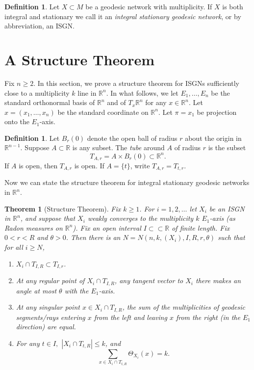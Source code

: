 \documentclass[11pt,reqno,twoside]{amsart}
\newtheorem{theorem}[lemma]{Theorem}
\theoremstyle{definition}
\newtheorem{definition}[lemma]{Definition}
\begin{document}
\begin{definition}
    Let $X \subset M$ be a geodesic network with multiplicity. If $X$ is both integral and stationary we call it an \emph{integral stationary geodesic network}, or by abbreviation, an ISGN.
\end{definition}

\section{A Structure Theorem}
\label{sec:structuretheorem}

Fix $n \geq 2$. In this section, we prove a structure theorem for ISGNs sufficiently close to a multiplicity $k$ line in $\mathbb{R}^n$. In what follows, we let $E_1,\ldots,E_n$ be the standard orthonormal basis of $\mathbb{R}^n$ and of $T_x \mathbb{R}^n$ for any $x \in \mathbb{R}^n$. Let $x = (x_1,\ldots,x_n)$ be the standard coordinate on $\mathbb{R}^n$. Let $\pi = x_1$ be projection onto the $E_1$-axis.

\begin{definition}
    Let $B_r(0)$ denote the open ball of radius $r$ about the origin in $\mathbb{R}^{n-1}$. Suppose $A \subset \mathbb{R}$ is any subset. The \emph{tube} around $A$ of radius $r$ is the subset 
    \[T_{A,r} = A \times B_r(0) \subset \mathbb{R}^n.\]
    If $A$ is open, then $T_{A,r}$ is open. If $A = \{t\}$, write $T_{A,r} = T_{t,r}$.
\end{definition}

Now we can state the structure theorem for integral stationary geodesic networks in $\mathbb{R}^n$.

\begin{theorem}[Structure Theorem] \label{structure-theorem}
    Fix $k \geq 1$. For $i = 1,2,\ldots$ let $X_i$ be an ISGN in $\mathbb{R}^n$, and suppose that $X_i$ weakly converges to the multiplicity $k$ $E_1$-axis (as Radon measures on $\mathbb{R}^n$). Fix an open interval $I \subset\subset \mathbb{R}$ of finite length. Fix $0 < r < R$ and $\theta > 0$. Then there is an $N = N(n,k,(X_i), I, R, r, \theta)$ such that for all $i \geq N$,
    \begin{enumerate}
        \item $X_i \cap T_{I,R} \subset T_{I,r}$.
        \item At any regular point of $X_i \cap T_{I,R}$, any tangent vector to $X_i$ there makes an angle at most $\theta$ with the $E_1$-axis.
        \item At any singular point $x \in X_i \cap T_{I,R}$, the sum of the multiplicities of geodesic segments/rays entering $x$ from the left and leaving $x$ from the right (in the $E_1$ direction) are equal.
        \item For any $t \in I,$ $|X_i \cap T_{t,R}| \leq k$, and 
        \[\sum_{x \in X_i \cap T_{t,R}} \Theta_{X_i}(x) = k.\]
    \end{enumerate}
\end{theorem}
\end{document}
